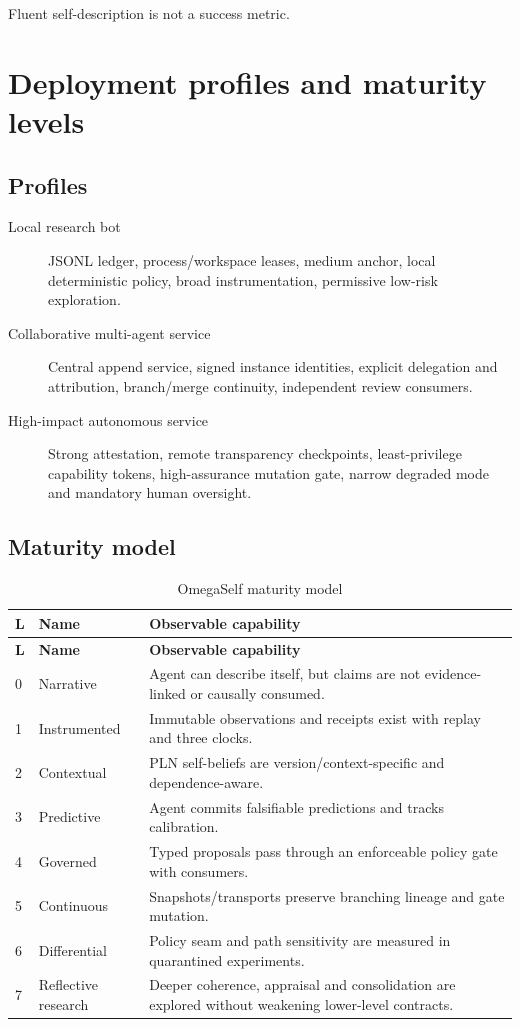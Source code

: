 \documentclass[11pt,oneside]{report}
\begin{document}
Fluent self-description is not a success metric.

\chapter{Deployment profiles and maturity levels}

\section{Profiles}

\begin{description}
  \item[Local research bot] JSONL ledger, process/workspace leases, medium anchor, local deterministic policy, broad instrumentation, permissive low-risk exploration.
  \item[Collaborative multi-agent service] Central append service, signed instance identities, explicit delegation and attribution, branch/merge continuity, independent review consumers.
  \item[High-impact autonomous service] Strong attestation, remote transparency checkpoints, least-privilege capability tokens, high-assurance mutation gate, narrow degraded mode and mandatory human oversight.
\end{description}

\section{Maturity model}

\begin{longtable}{@{}C{0.50in}L{1.45in}L{4.50in}@{}}
\caption{OmegaSelf maturity model}\label{tab:maturity}\\
\toprule
\textbf{L} & \textbf{Name} & \textbf{Observable capability} \\
\midrule
\endfirsthead
\toprule
\textbf{L} & \textbf{Name} & \textbf{Observable capability} \\
\midrule
{} & Narrative & Agent can describe itself, but claims are not evidence-linked or causally consumed. \\
1 & Instrumented & Immutable observations and receipts exist with replay and three clocks. \\
2 & Contextual & PLN self-beliefs are version/context-specific and dependence-aware. \\
3 & Predictive & Agent commits falsifiable predictions and tracks calibration. \\
4 & Governed & Typed proposals pass through an enforceable policy gate with consumers. \\
5 & Continuous & Snapshots/transports preserve branching lineage and gate mutation. \\
6 & Differential & Policy seam and path sensitivity are measured in quarantined experiments. \\
7 & Reflective research & Deeper coherence, appraisal and consolidation are explored without weakening lower-level contracts. \\
\bottomrule
\end{longtable}
\end{document}
